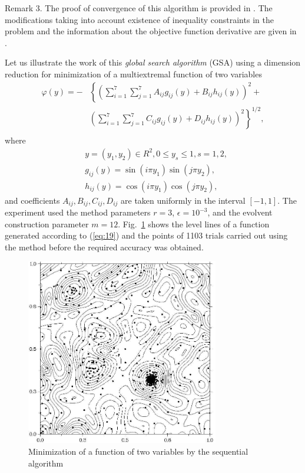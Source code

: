 \documentclass[smallcondensed]{svjour3}     %
\begin{document}

Remark 3. The proof of convergence of this algorithm is provided in \cite{RefStrongin2000}. The modifications taking into account existence of inequality constraints in the problem and the information about the objective function derivative are given in \cite{RefBarkalov,RefGergel1996,RefGergel1997}.

Let us illustrate the work of this \textit{global search algorithm} (GSA) using a dimension reduction for minimization of a multiextremal function of two variables 
\begin{eqnarray} \nonumber \label{eq:19}
\varphi(y)= -&\left\{\left(\sum^{7}_{i=1}\sum^{7}_{j=1}A_{ij}g_{ij}(y)+B_{ij}h_{ij}(y)\right)^2+\right. \\
&\left.\left(\sum^{7}_{i=1}\sum^{7}_{j=1}C_{ij}g_{ij}(y)+D_{ij}h_{ij}(y)\right)^2\right\}^{1/2},\\ \nonumber
\end{eqnarray}
where
\begin{eqnarray} \nonumber
& y=(y_1,y_2)\in R^2, 0 \leq y_s \leq 1, s=1,2, \\ \nonumber
& g_{ij}(y)=\sin(i\pi y_1)\sin(j\pi y_2),  \\ \nonumber
& h_{ij}(y)=\cos(i\pi y_1)\cos(j\pi y_2), \nonumber 
\end{eqnarray}
and coefficients $A_{ij}, B_{ij}, C_{ij}, D_{ij}$  are taken uniformly in the interval $[-1,1]$. The experiment used the method parameters $r=3$, $\epsilon=10^{-3}$, and the evolvent construction parameter $m=12$. Fig.~\ref{fig:1} shows the level lines of a function generated according to (\ref{eq:19}) and the points of 1103 trials carried out using the method before the required accuracy was obtained.
\begin{figure}
	\center
  \includegraphics[width=0.75\textwidth]{fig2.jpg} 
  \caption{Minimization of a function of two variables by the sequential algorithm}
  \label{fig:1}       %
\end{figure}
\end{document}
